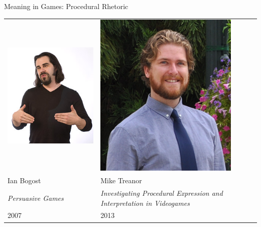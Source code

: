 \documentclass[xcolor=x11names]{beamer}
\newcommand{\work}[1]{\textit{#1}\xspace}
\begin{document}
\begin{frame}{Meaning in Games: Procedural Rhetoric}
  \begin{tabular}{C{0.45\textwidth} C{0.45\textwidth}}
    \includegraphics[height=0.3\textwidth]{res/bogost.jpg} &
    \includegraphics[height=0.3\textwidth]{res/treanor.png} \\
    Ian Bogost & Mike Treanor \\
    \work{Persuasive Games} & \work{Investigating Procedural Expression and Interpretation in Videogames} \\
    2007 & 2013 \\
  \end{tabular}
\end{frame}
\end{document}
